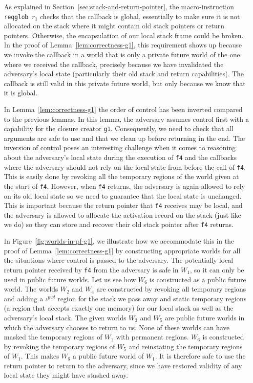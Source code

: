 \documentclass[compsoc,conference,letterpaper,fleqn]{IEEEtran}
\newcommand{\var}[1]{\mathit{#1}}
\newcommand{\pwl}{\var{pwl}}
\begin{document}
As explained in Section~\ref{sec:stack-and-return-pointer}, the
macro-instruction \texttt{\footnotesize{reqglob $r_1$}} checks that the callback
is global, essentially to make sure it is not allocated on the stack where it
might contain old stack pointers or return pointers. Otherwise, the
encapsulation of our local stack frame could be broken. In the proof of
Lemma~\ref{lem:correctness-g1}, this requirement shows up because we invoke the
callback in a world that is only a private future world of the one where we
received the callback, precisely because we have invalidated the adversary's
local state (particularly their old stack and return capabilities). The callback
is still valid in this private future world, but only because we know that it is
global.

In Lemma~\ref{lem:correctness-g1} the order of control has been
inverted compared to the previous lemmas. In this lemma, the adversary
assumes control first with a capability for the closure creator
\texttt{\footnotesize{g1}}. Consequently, we need to check that all
arguments are safe to use and that we clean up before returning in the
end. The inversion of control poses an interesting challenge when it
comes to reasoning about the adversary's local state during the
execution of \texttt{\footnotesize{f4}} and the callbacks where the
adversary should not rely on the local state from before the call of
\texttt{\footnotesize{f4}}. This is easily done by revoking all the
temporary regions of the world given at the start of
\texttt{\footnotesize{f4}}. However, when \texttt{\footnotesize{f4}}
returns, the adversary is again allowed to rely on its old local state
so we need to guarantee that the local state is unchanged. This is
important because the return pointer that \texttt{\footnotesize{f4}}
receives may be local, and the adversary is allowed
to allocate the activation record on the stack (just like we do) so
they can store and recover their old stack pointer after
\texttt{\footnotesize{f4}} returns.

In Figure~\ref{fig:worlds-in-pf-g1}, we illustrate how we accommodate this in the
proof of Lemma~\ref{lem:correctness-g1} by constructing appropriate worlds for
all the situations where control is passed to the adversary. The potentially
local return pointer received by \texttt{\footnotesize{f4}} from the adversary is safe in
$W_1$, so it can only be used in public future worlds. Let us see how $W_6$ is
constructed as a public future world. The worlds $W_2$ and $W_4$ are constructed
by revoking all temporary regions and adding a $\iota^\pwl$ region for the stack
we pass away and static temporary regions (a region that accepts exactly one
memory) for our local stack as well as the adversary's local stack. The given
worlds $W_3$ and $W_5$ are public future worlds in which the adversary chooses
to return to us. None of these worlds can have masked the temporary regions of
$W_1$ with permanent regions. $W_6$ is constructed by revoking the temporary
regions of $W_5$ and reinstating the temporary regions of $W_1$. This makes
$W_6$ a public future world of $W_1$. It is therefore safe to use the return
pointer to return to the adversary, since we have restored validity of any local
state they might have stashed away.
\end{document}
